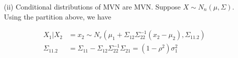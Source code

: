 \begin{itemize}
\begin{proof}
from which it is obvious that $M_{X_a, X_b}(t_a, t_b) = M_{X_a}(t_a) M_{X_b}(t_b)$ if and only if $V_{ab} = 0$.

\end{proof}

\item[(ii)] Conditional distributions of MVN are MVN. 
Suppose $X \sim N_n(\mu, \Sigma)$. Using the partition above, we have

\begin{align*}
	X_1 | X_2 &= x_2 \sim N_r(\mu_1 + \Sigma_{12} \Sigma_{22}^{-1} (x_2 - \mu_2), \Sigma_{11.2})\\
	\Sigma_{11.2} &= \Sigma_{11} - \Sigma_{12} \Sigma_{22}^{-1} \Sigma_{21} = (1 - \rho^2) \sigma_1^2
\end{align*}
\end{itemize}





